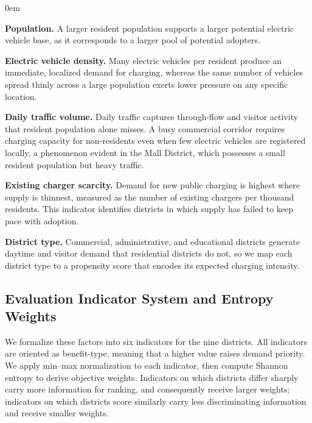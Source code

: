 \documentclass[11pt]{article}
\begin{document}
\begin{addmargin}[1.5em]{0em}

\textbf{Population.} A larger resident population supports a larger potential electric vehicle base, as it corresponds to a larger pool of potential adopters.

\textbf{Electric vehicle density.} Many electric vehicles per resident produce an immediate, localized demand for charging, whereas the same number of vehicles spread thinly across a large population exerts lower pressure on any specific location.

\textbf{Daily traffic volume.} Daily traffic captures through-flow and visitor activity that resident population alone misses. A busy commercial corridor requires charging capacity for non-residents even when few electric vehicles are registered locally, a phenomenon evident in the Mall District, which possesses a small resident population but heavy traffic.

\textbf{Existing charger scarcity.} Demand for new public charging is highest where supply is thinnest, measured as the number of existing chargers per thousand residents. This indicator identifies districts in which supply has failed to keep pace with adoption.

\textbf{District type.} Commercial, administrative, and educational districts generate daytime and visitor demand that residential districts do not, so we map each district type to a propensity score that encodes its expected charging intensity.

\end{addmargin}

\subsection{Evaluation Indicator System and Entropy Weights}
\label{subsec:entropy}

We formalize these factors into six indicators for the nine districts. All indicators are oriented as benefit-type, meaning that a higher value raises demand priority. We apply min--max normalization to each indicator, then compute Shannon entropy to derive objective weights. Indicators on which districts differ sharply carry more information for ranking, and consequently receive larger weights; indicators on which districts score similarly carry less discriminating information and receive smaller weights.
\end{document}
